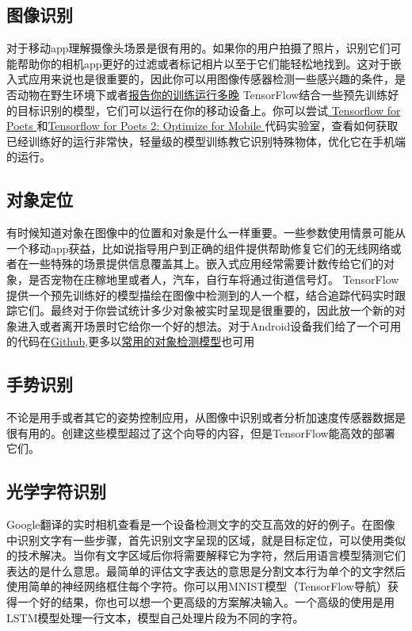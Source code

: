 \subsection{图像识别}
对于移动app理解摄像头场景是很有用的。如果你的用户拍摄了照片，识别它们可能帮助你的相机app更好的过滤或者标记相片以至于它们能轻松地找到。这对于嵌入式应用来说也是很重要的，因此你可以用图像传感器检测一些感兴趣的条件，是否动物在野生环境下或者\href{https://svds.com/tensorflow-image-recognition-raspberry-pi/}{报告你的训练运行多晚}
TensorFlow结合一些预先训练好的目标识别的模型，它们可以运行在你的移动设备上。你可以尝试\href{https://codelabs.developers.google.com/codelabs/tensorflow-for-poets/index.html?hl=zh-cn#0}{ Tensorflow for Poets }和\href{https://codelabs.developers.google.com/codelabs/tensorflow-for-poets-2/index.html?hl=zh-cn#0}{Tensorflow for Poets 2: Optimize for Mobile }代码实验室，查看如何获取已经训练好的运行非常快，轻量级的模型训练教它识别特殊物体，优化它在手机端的运行。
\subsection{对象定位}
有时候知道对象在图像中的位置和对象是什么一样重要。一些参数使用情景可能从一个移动app获益，比如说指导用户到正确的组件提供帮助修复它们的无线网络或者在一些特殊的场景提供信息覆盖其上。嵌入式应用经常需要计数传给它们的对象，是否宠物在庄稼地里或者人，汽车，自行车将通过街道信号灯。
TensorFlow提供一个预先训练好的模型描绘在图像中检测到的人一个框，结合追踪代码实时跟踪它们。最终对于你尝试统计多少对象被实时呈现是很重要的，因此放一个新的对象进入或者离开场景时它给你一个好的想法。对于Android设备我们给了一个可用的代码在\href{https://github.com/tensorflow/tensorflow/tree/master/tensorflow/examples/android}{Github},更多以\href{https://github.com/tensorflow/models/tree/master/object_detection/README.md}{常用的对象检测模型}也可用
\subsection{手势识别}
不论是用手或者其它的姿势控制应用，从图像中识别或者分析加速度传感器数据是很有用的。创建这些模型超过了这个向导的内容，但是TensorFlow能高效的部署它们。
\subsection{光学字符识别}
Google翻译的实时相机查看是一个设备检测文字的交互高效的好的例子。在图像中识别文字有一些步骤，首先识别文字呈现的区域，就是目标定位，可以使用类似的技术解决。当你有文字区域后你将需要解释它为字符，然后用语言模型猜测它们表达的是什么意思。最简单的评估文字表达的意思是分割文本行为单个的文字然后使用简单的神经网络框住每个字符。你可以用MNIST模型（TensorFlow导航）获得一个好的结果，你也可以想一个更高级的方案解决输入。一个高级的使用是用LSTM模型处理一行文本，模型自己处理片段为不同的字符。
